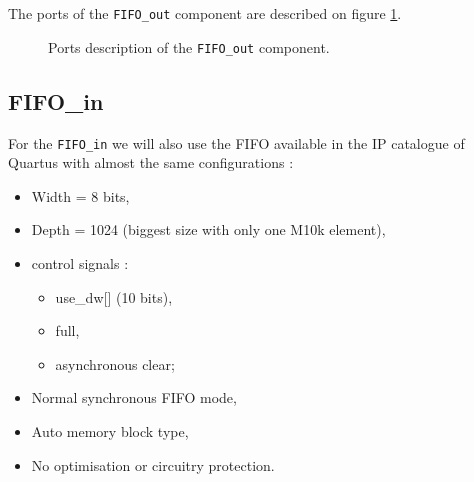 \documentclass[11pt]{article}
\begin{document}
The ports of the \texttt{FIFO\_out} component are described on figure \ref{fifo_out_ports}.
\begin{figure}[H]
        \caption{Ports description of the \texttt{FIFO\_out} component.}
        \label{fifo_out_ports}
\end{figure}

\subsection{FIFO\_in}
For the \texttt{FIFO\_in} we will also use the FIFO available in the IP catalogue of Quartus with almost the same configurations :
\begin{itemize}
    \item Width = 8 bits,
    \item Depth = 1024 (biggest size with only one M10k element),
    \item control signals : \begin{itemize}
        \item use\_dw[] (10 bits),
        \item full,
        \item asynchronous clear; \end{itemize}
    \item Normal synchronous FIFO mode,
    \item Auto memory block type,
    \item No optimisation or circuitry protection.
\end{itemize}
\end{document}
